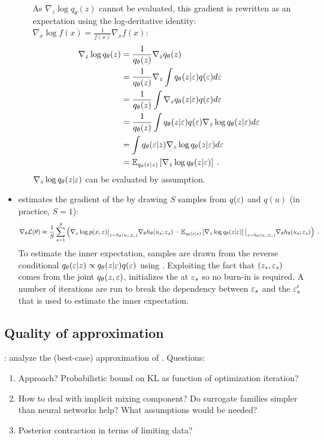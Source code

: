 \documentclass[10pt]{article}
\begin{document}
\begin{itemize}
\begin{itemize}
As $\nabla_z\log q_\theta(z)$ cannot be evaluated, this gradient is rewritten as an expectation using the log-deritative identity: $\nabla_x\log f(x) = \frac{1}{f(x)}\nabla_x f(x)$:
\begin{align*}
\nabla_z\log q_\theta(z) &= \frac{1}{q_\theta(z)}\nabla_zq_\theta(z) \\
&= \frac{1}{q_\theta(z)}\nabla_z\int q_\theta(z|\varepsilon)q(\varepsilon)d\varepsilon \\
&= \frac{1}{q_\theta(z)}\int \nabla_z q_\theta(z|\varepsilon)q(\varepsilon)d\varepsilon \\
&= \frac{1}{q_\theta(z)}\int q_\theta(z|\varepsilon)q(\varepsilon)\nabla_z\log q_\theta(z|\varepsilon)d\varepsilon \\
&= \int q_\theta(\varepsilon|z)\nabla_z\log q_\theta(z|\varepsilon)d\varepsilon \\
&= \mathbb{E}_{q_\theta(\varepsilon|z)}\left[\nabla_z\log q_\theta(z|\varepsilon)\right]\;.
\end{align*}
$\nabla_z\log q_\theta(z|\varepsilon)$ can be evaluated by assumption.
\end{itemize}
\item
\uivi estimates the gradient of the \elbo by drawing $S$ samples from $q(\varepsilon)$ and $q(u)$ (in practice, $S=1$):
\[
\nabla_\theta\mathcal{L}(\theta) \approx \frac{1}{S}\sum_{s=1}^S\left(\nabla_z\log p(x,z)\big|_{z=h_\theta(u_s,\varepsilon_s)}\nabla_\theta h_\theta(u_s;\varepsilon_s) - \mathbb{E}_{q_\theta(\varepsilon|z)}\left[\nabla_z\log q_\theta(z|\varepsilon)\right]\big|_{z=h_\theta(u_s;\varepsilon_s)}\nabla_\theta h_\theta(u_s;\varepsilon_s)\right) \;.
\]
To estimate the inner expectation, samples are drawn from the reverse conditional $q_\theta(\varepsilon|z)\propto q_\theta(z|\varepsilon)q(\varepsilon)$ using \mcmc. Exploiting the fact that $(z_s,\varepsilon_s)$ comes from the joint $q_\theta(z,\varepsilon)$, \uivi initializes the \mcmc at $\varepsilon_s$ so no burn-in is required. A number of iterations are run to break the dependency between $\varepsilon_s$ and the $\varepsilon_s'$ that is used to estimate the inner expectation.

\end{itemize}

\subsection{Quality of approximation}

\todo: analyze the (best-case) approximation of \uivi. Questions:
\begin{enumerate}
\item
Approach? Probabilistic bound on KL as function of \elbo optimization iteration?
\item
How to deal with implicit mixing component? Do surrogate families simpler than neural networks help? What assumptions would be needed?
\item
Posterior contraction in terms of limiting data?
\end{enumerate}
\end{document}
